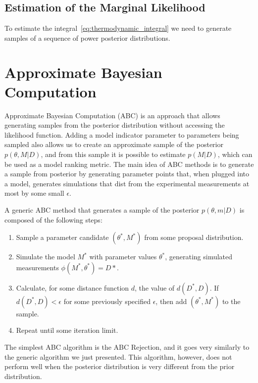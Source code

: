 \subsection{Estimation of the Marginal Likelihood}
To estimate the integral~\ref{eq:thermodynamic_integral} we need to 
generate samples of a sequence of power posterior distributions.


\section{Approximate Bayesian Computation}
Approximate Bayesian Computation (ABC) is an approach that allows 
generating samples from the posterior distribution without accessing the
likelihood function. Adding a model indicator parameter to parameters 
being sampled also allows us to create an approximate sample of the 
posterior $p (\theta, M | D)$, and from this sample it is possible to 
estimate $p (M | D)$, which can be used as a model ranking metric. The 
main idea of ABC methods is to generate a sample from posterior by 
generating parameter points that, when plugged into a model, generates 
simulations that dist from the experimental measurements at most by some
small $\epsilon$.

A generic ABC method that generates a sample of the posterior 
$p (\theta, m | D)$ is composed of the following steps:
\begin{enumerate}
    \item{Sample a parameter candidate $(\theta^*, M^*)$ from some 
        proposal distribution.}
    \item{Simulate the model $M^*$ with parameter values $\theta^*$, 
        generating simulated measurements $\phi (M^*, \theta^*) = D*$.}
    \item{Calculate, for some distance function $d$, the value of
        $d (D^*, D)$. If $d (D^*, D) < \epsilon$ for some previously
        specified $\epsilon$, then add $(\theta^*, M^*)$ to the sample.}
    \item{Repeat until some iteration limit.}
\end{enumerate}

The simplest ABC algorithm is the ABC Rejection, and it goes very 
similarly to the generic algorithm we just presented. This algorithm, 
however, does not perform well when the posterior distribution is very
different from the prior distribution. 
